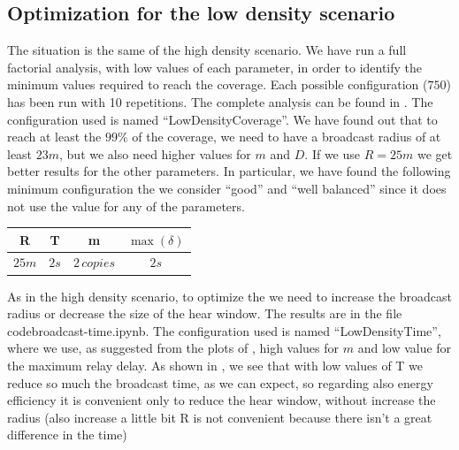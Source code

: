 \subsection{Optimization for the low density
scenario}\label{subsec:ldoptimization}

The situation is the same of the high density scenario. We have run a full
factorial analysis, with low values of each parameter, in order to identify the
minimum values required to reach the coverage. Each possible configuration
(\(750\)) has been run with 10 repetitions. The complete analysis can be found
in . The configuration used is named
``LowDensityCoverage''. We have found out that to reach at least the \(99\%\) of
the coverage, we need to have a broadcast radius of at least \(23m\), but we
also need higher values for \(m\) and \(D\). If we use \(R\!=\!25m\) we get
better results for the other parameters. In particular, we have found the
following minimum configuration the we consider ``good'' and ``well balanced''
since it does not use the value  for any of the parameters.

\begin{center}
	\begin{tabular}{cccc}
		\toprule
		R & T & m & \(\max(\delta)\) \\
		\midrule
		\(25m\) & \(2s\) & \(2\,\mathit{copies}\) & \(2s\) \\
		\bottomrule
	\end{tabular}
\end{center}

As in the high density scenario, to optimize the 
we need to increase the broadcast radius or decrease the size of the hear
window. The results are in the file code{broadcast-time.ipynb}. The
configuration used is named ``LowDensityTime'', where we use, as suggested from
the plots of , high values for \(m\) and low value for the
maximum relay delay. As shown in , we see that with low
values of T we reduce so much the broadcast time, as we can expect, so regarding
also energy efficiency it is convenient only to reduce the hear window, without
increase the radius (also increase a little bit R is not convenient because
there isn't a great difference in the time)

